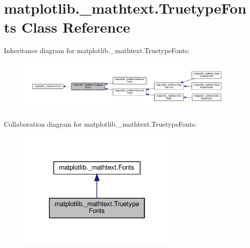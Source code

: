 \hypertarget{classmatplotlib_1_1__mathtext_1_1TruetypeFonts}{}\section{matplotlib.\+\_\+mathtext.\+Truetype\+Fonts Class Reference}
\label{classmatplotlib_1_1__mathtext_1_1TruetypeFonts}


Inheritance diagram for matplotlib.\+\_\+mathtext.\+Truetype\+Fonts\+:
\nopagebreak
\begin{figure}[H]
\begin{center}
\leavevmode
\includegraphics[width=350pt]{classmatplotlib_1_1__mathtext_1_1TruetypeFonts__inherit__graph}
\end{center}
\end{figure}


Collaboration diagram for matplotlib.\+\_\+mathtext.\+Truetype\+Fonts\+:
\nopagebreak
\begin{figure}[H]
\begin{center}
\leavevmode
\includegraphics[width=226pt]{classmatplotlib_1_1__mathtext_1_1TruetypeFonts__coll__graph}
\end{center}
\end{figure}
